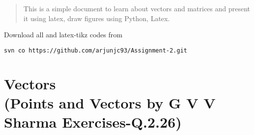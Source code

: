 \documentclass[journal,12pt,twocolumn]{IEEEtran}
\begin{document}
\newpage
\bigskip
\renewcommand{\thefigure}{\theenumi}
\renewcommand{\thetable}{\theenumi}
\begin{abstract}
This is a simple document to learn about vectors and matrices and present it using latex, draw figures using Python, Latex.
\end{abstract}
%
Download all and latex-tikz codes from 
%
\begin{lstlisting}
svn co https://github.com/arjunjc93/Assignment-2.git
\end{lstlisting}
%
\section{Vectors\\(Points and Vectors by G V V Sharma Exercises-Q.2.26)}
\renewcommand{\theequation}{\theenumi}
\end{document}
